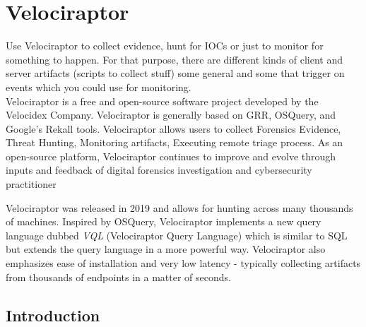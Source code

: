 

\section{Velociraptor}
Use Velociraptor to collect evidence, hunt for IOCs or just to monitor for something to happen. For that purpose, there are different kinds of client and server artifacts (scripts to collect stuff) some general and some that trigger on events which you could use for
monitoring.\\

Velociraptor is a free and open-source software project developed by the Velocidex Company. Velociraptor is generally based on GRR, OSQuery, and Google's Rekall tools. Velociraptor allows users to collect Forensics Evidence, Threat Hunting, Monitoring artifacts, Executing remote triage process. As an open-source platform, Velociraptor continues to improve and evolve through inputs and feedback of digital forensics investigation and cybersecurity practitioner

Velociraptor was released in 2019 and allows for hunting across many thousands of machines. Inspired by OSQuery, Velociraptor implements a new query language dubbed \textit{VQL} (Velociraptor Query Language) which is similar to SQL but extends the query language in a more powerful way. Velociraptor also emphasizes ease of installation and very low latency - typically collecting artifacts from thousands of endpoints in a matter of seconds.

\subsection{Introduction}


